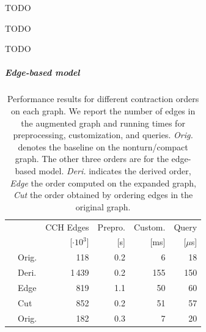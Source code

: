 \documentclass[a4paper, english, cleveref]{lipics-v2021}
\begin{document}
\begin{table}
\centering
\setlength{\tabcolsep}{5pt}
\caption{
TODO
}\label{tab:preprocessing}

\end{table}

\begin{table}
\centering
\setlength{\tabcolsep}{5pt}
\caption{
TODO
}\label{tab:customization}

\end{table}

\begin{table}
\centering
\setlength{\tabcolsep}{5pt}
\caption{
TODO
}\label{tab:queries}

\end{table}

\subparagraph{Edge-based model}

\begin{table}[tb]
\parbox{.5\linewidth}{
\setlength{\tabcolsep}{2.8pt}
\centering
\caption{
Performance results for different contraction orders on each graph.
We report the number of edges in the augmented graph and running times for preprocessing, customization, and queries.
\emph{Orig.} denotes the baseline on the nonturn/compact graph.
The other three orders are for the edge-based model.
\emph{Deri.} indicates the derived order, \emph{Edge} the order computed on the expanded graph, \emph{Cut} the order obtained by ordering edges in the original graph.
}\label{tab:orders}
\begin{tabular}{llrrrr}
\toprule
       & &      CCH Edges & Prepro. & Custom. &    Query \\
       & & [$\cdot 10^3$] &     [s] &    [ms] & [$\mu$s] \\
\midrule
\parbox[t]{3mm}{}
& Orig. &            118 &                  0.2 &                               6 &              18 \\
& Deri. &           1\,439 &                  0.2 &                             155 &             150 \\
& Edge &            819 &                  1.1 &                              50 &              60 \\
& Cut &            852 &                  0.2 &                              51 &              57 \\
\addlinespace
\parbox[t]{3mm}{}
& Orig. &            182 &                  0.3 &                               7 &              20 \\

\end{tabular}}
\end{table}
\end{document}
